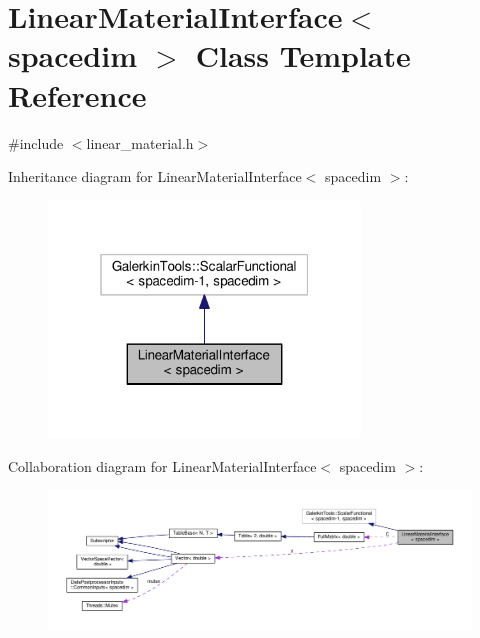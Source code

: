 \hypertarget{class_linear_material_interface}{}\section{Linear\+Material\+Interface$<$ spacedim $>$ Class Template Reference}
\label{class_linear_material_interface}


{\ttfamily \#include $<$linear\+\_\+material.\+h$>$}



Inheritance diagram for Linear\+Material\+Interface$<$ spacedim $>$\+:\nopagebreak
\begin{figure}[H]
\begin{center}
\leavevmode
\includegraphics[width=235pt]{class_linear_material_interface__inherit__graph}
\end{center}
\end{figure}


Collaboration diagram for Linear\+Material\+Interface$<$ spacedim $>$\+:
\nopagebreak
\begin{figure}[H]
\begin{center}
\leavevmode
\includegraphics[width=350pt]{class_linear_material_interface__coll__graph}
\end{center}
\end{figure}
